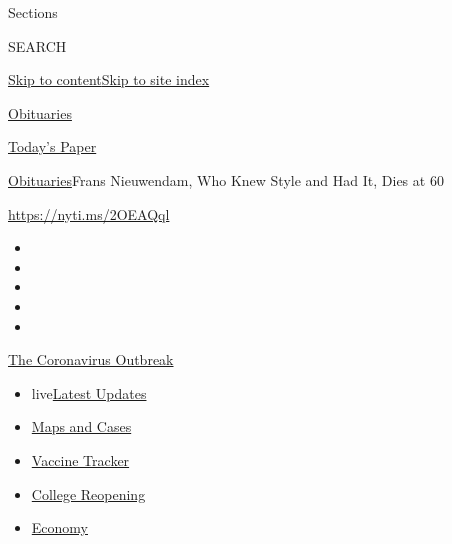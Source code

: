 Sections

SEARCH

\protect\hyperlink{site-content}{Skip to
content}\protect\hyperlink{site-index}{Skip to site index}

\href{https://www.nytimes.com/section/obituaries}{Obituaries}

\href{https://myaccount.nytimes.com/auth/login?response_type=cookie\&client_id=vi}{}

\href{https://www.nytimes.com/section/todayspaper}{Today's Paper}

\href{/section/obituaries}{Obituaries}\textbar{}Frans Nieuwendam, Who
Knew Style and Had It, Dies at 60

\url{https://nyti.ms/2OEAQql}

\begin{itemize}
\item
\item
\item
\item
\item
\end{itemize}

\href{https://www.nytimes.com/news-event/coronavirus?action=click\&pgtype=Article\&state=default\&region=TOP_BANNER\&context=storylines_menu}{The
Coronavirus Outbreak}

\begin{itemize}
\tightlist
\item
  live\href{https://www.nytimes.com/2020/08/03/world/coronavirus-covid-19.html?action=click\&pgtype=Article\&state=default\&region=TOP_BANNER\&context=storylines_menu}{Latest
  Updates}
\item
  \href{https://www.nytimes.com/interactive/2020/us/coronavirus-us-cases.html?action=click\&pgtype=Article\&state=default\&region=TOP_BANNER\&context=storylines_menu}{Maps
  and Cases}
\item
  \href{https://www.nytimes.com/interactive/2020/science/coronavirus-vaccine-tracker.html?action=click\&pgtype=Article\&state=default\&region=TOP_BANNER\&context=storylines_menu}{Vaccine
  Tracker}
\item
  \href{https://www.nytimes.com/2020/08/02/us/covid-college-reopening.html?action=click\&pgtype=Article\&state=default\&region=TOP_BANNER\&context=storylines_menu}{College
  Reopening}
\item
  \href{https://www.nytimes.com/live/2020/08/03/business/stock-market-today-coronavirus?action=click\&pgtype=Article\&state=default\&region=TOP_BANNER\&context=storylines_menu}{Economy}
\end{itemize}

